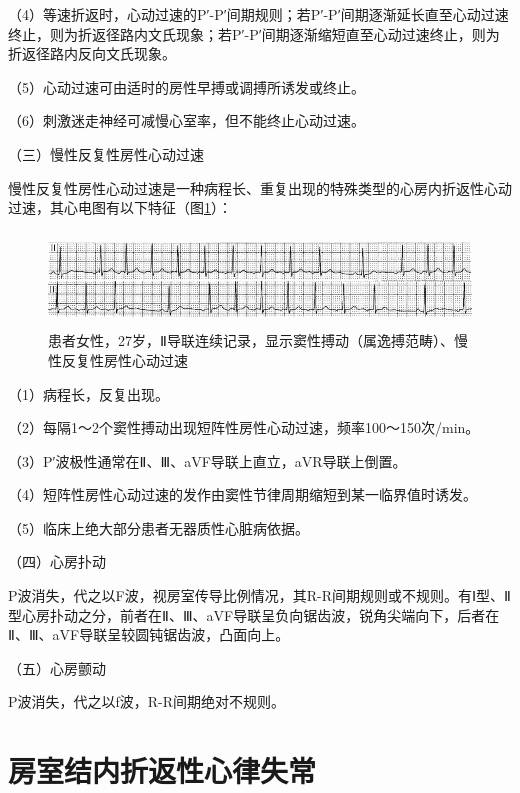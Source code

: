 （4）等速折返时，心动过速的P′-P′间期规则；若P′-P′间期逐渐延长直至心动过速终止，则为折返径路内文氏现象；若P′-P′间期逐渐缩短直至心动过速终止，则为折返径路内反向文氏现象。

（5）心动过速可由适时的房性早搏或调搏所诱发或终止。

（6）刺激迷走神经可减慢心室率，但不能终止心动过速。

（三）慢性反复性房性心动过速

慢性反复性房性心动过速是一种病程长、重复出现的特殊类型的心房内折返性心动过速，其心电图有以下特征（图\ref{fig14-5}）：

\begin{figure}[!htbp]
 \centering
 \includegraphics[width=5.58333in,height=0.98958in]{./images/Image00249.jpg}
 \captionsetup{justification=centering}
 \caption{患者女性，27岁，Ⅱ导联连续记录，显示窦性搏动（属逸搏范畴）、慢性反复性房性心动过速}
 \label{fig14-5}
  \end{figure} 

（1）病程长，反复出现。

（2）每隔1～2个窦性搏动出现短阵性房性心动过速，频率100～150次/min。

（3）P′波极性通常在Ⅱ、Ⅲ、aVF导联上直立，aVR导联上倒置。

（4）短阵性房性心动过速的发作由窦性节律周期缩短到某一临界值时诱发。

（5）临床上绝大部分患者无器质性心脏病依据。

（四）心房扑动

P波消失，代之以F波，视房室传导比例情况，其R-R间期规则或不规则。有Ⅰ型、Ⅱ型心房扑动之分，前者在Ⅱ、Ⅲ、aVF导联呈负向锯齿波，锐角尖端向下，后者在Ⅱ、Ⅲ、aVF导联呈较圆钝锯齿波，凸面向上。

（五）心房颤动

P波消失，代之以f波，R-R间期绝对不规则。

\protect\hypertarget{text00021.htmlux5cux23subid237}{}{}

\section{房室结内折返性心律失常}

\protect\hypertarget{text00021.htmlux5cux23subid238}{}{}

